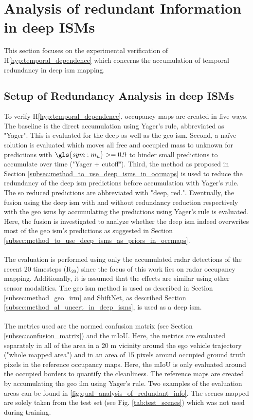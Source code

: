 \section{Analysis of redundant Information in deep ISMs}
\label{sec:exp_analyze_redundant_info}
This section focuses on the experimental verification of H\ref{hyp:temporal_dependence} which concerns the accumulation of temporal redundancy in deep \gls{ism} mapping.
%
\subsection{Setup of Redundancy Analysis in deep ISMs}
\label{subsec:setup_of_red_analy}
To verify H\ref{hyp:temporal_dependence}, occupancy maps are created in five ways. The baseline is the direct accumulation using Yager's rule, abbreviated as "Yager". This is evaluated for the deep as well as the geo \gls{ism}. Second, a na\"ive solution is evaluated which moves all free and occupied mass to unknown for predictions with $\gls{sym:m_u}>=0.9$ to hinder small predictions to accumulate over time ("Yager + cutoff"). Third, the method as proposed in Section \ref{subsec:method_to_use_deep_isms_in_occmaps} is used to reduce the redundancy of the deep \gls{ism} predictions before accumulation with Yager's rule. The so reduced predictions are abbreviated with "deep, red.". Eventually, the fusion using the deep \gls{ism} with and without redundancy reduction respectively with the geo \gls{ism}s by accumulating the predictions using Yager's rule is evaluated. Here, the fusion is investigated to analyze whether the deep \gls{ism} indeed overwrites most of the geo \gls{ism}'s predictions as suggested in Section \ref{subsec:method_to_use_deep_isms_as_priors_in_occmaps}.
\\\\
The evaluation is performed using only the accumulated radar detections of the recent 20 timesteps (R$_{20}$) since the focus of this work lies on radar occupancy mapping. Additionally, it is assumed that the effects are similar using other sensor modalities. The geo \gls{ism} method is used as described in Section \ref{subsec:method_geo_irm} and ShiftNet, as described Section \ref{subsec:method_al_uncert_in_deep_isms}, is used as a deep \gls{ism}.
\\\\
The metrics used are the normed confusion matrix (see Section \ref{subsec:confusion_matrix}) and the mIoU. Here, the metrics are evaluated separately in all of the area in a 20 m vicinity around the ego vehicle trajectory ("whole mapped area") and in an area of 15 pixels around occupied ground truth pixels in the reference occupancy maps. Here, the mIoU is only evaluated around the occupied borders to quantify the cleanliness. The reference maps are created by accumulating the geo \gls{ilm} using Yager's rule. Two examples of the evaluation areas can be found in \ref{fig:qual_analysis_of_redundant_info}. The scenes mapped are solely taken from the test set (see Fig. \ref{tab:test_scenes}) which was not used during training.
%
